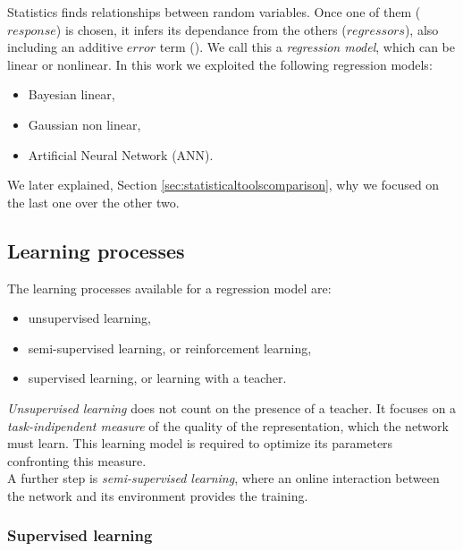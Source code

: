 Statistics finds relationships between random variables.
Once one of them ($response$) is chosen, it infers its dependance from the
others ($regressors$), also including an additive $error$ term
(\citet{RefWorks:109, RefWorks:112, RefWorks:113, RefWorks:194}). We call this a
\textit{regression model}, which can be linear or nonlinear.
In this work we exploited the following regression models:
\begin{itemize}
  \item{Bayesian linear,}
  \item{Gaussian non linear,}
  \item{Artificial Neural Network (\acs{ANN}).}
\end{itemize}
We later explained, Section \ref{sec:statisticaltoolscomparison}, why we focused
on the last one over the other two.

\subsection{Learning processes}
\label{subsec:learningprocesses}

The learning processes available for a regression model are:

\begin{itemize}
  \item{unsupervised learning,}
  \item{semi-supervised learning, or reinforcement learning,}  
  \item{supervised learning, or learning with a teacher.}
\end{itemize}

\textit{Unsupervised learning} does not count on the presence of a teacher.
It focuses on a \textit{task-indipendent measure} of the quality of the
representation, which the network must learn. 
This learning model is required to optimize its
parameters confronting this measure.\\
A further step is \textit{semi-supervised learning}, where an online interaction
between the network and its environment provides the training.

\subsubsection{Supervised learning}
\label{subsubsec:supervisedlearning}

